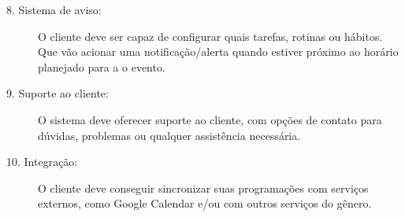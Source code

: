 \begin{description}
  \item[8. Sistema de aviso:] O cliente deve ser capaz de configurar quais
  tarefas, rotinas ou hábitos. Que vão acionar uma notificação/alerta quando
  estiver próximo ao horário planejado para a o evento.

  \item[9. Suporte ao cliente:] O sistema deve oferecer suporte ao cliente, com
  opções de contato para dúvidas, problemas ou qualquer assistência necessária.

  \item[10. Integração:] O cliente deve conseguir sincronizar suas programações com
  serviços externos, como Google Calendar e/ou com outros serviços do gênero.

\end{description}
